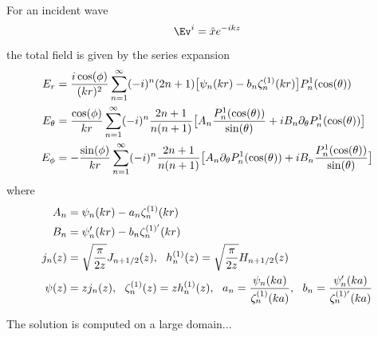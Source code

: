 For an incident wave
\[
   \Ev^i = \hat{x} e^{-ikz}
\]
the total field is given by the series expansion
\begin{align*}
   E_r &= {i\cos(\phi)\over (kr)^2} 
              \sum_{n=1}^\infty (-i)^n (2n+1)\big[ \psi_n(kr) - b_n \zeta_n^{(1)}(kr)\big] P_n^1(\cos(\theta)) \\
   E_\theta &= {\cos(\phi)\over kr}
              \sum_{n=1}^\infty (-i)^n {2n+1 \over n(n+1)}
                 \big[ A_n {P_n^1(\cos(\theta)) \over \sin(\theta)}
                      +i B_n \partial_\theta P_n^1(\cos(\theta)) \big] \\
   E_\phi &= -{\sin(\phi)\over kr}
              \sum_{n=1}^\infty (-i)^n {2n+1 \over n(n+1)}
                 \big[ A_n \partial_\theta P_n^1(\cos(\theta))
                      +i B_n {P_n^1(\cos(\theta)) \over \sin(\theta)} \big] \\ 
\end{align*}
where
\begin{align*}
 A_n &= \psi_n(kr) - a_n \zeta_n^{(1)}(kr) \\
 B_n &= \psi_n'(kr) - b_n \zeta_n^{(1)'}(kr) \\
  j_n(z) &= \sqrt{\pi\over 2 z} J_{n+1/2}(z), ~~ h_n^{(1)}(z)= \sqrt{\pi\over 2 z} H_{n+1/2}(z) \\
  \psi(z) &= z j_n(z), ~~ \zeta_n^{(1)}(z)= z h_n^{(1)}(z), ~~ a_n={\psi_n(ka)\over \zeta_n^{(1)}(ka)}, ~~
       b_n ={\psi_n'(ka)\over \zeta_n^{(1)'}(ka)}
\end{align*}

The solution is computed on a large domain... 





